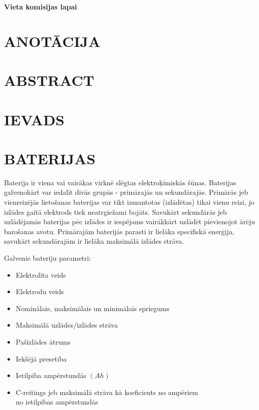\documentclass[12pt,fleqn,titlepage,oneside]{article}
\numberwithin{equation}{section}
\numberwithin{figure}{section}
\numberwithin{table}{section}
\begin{document}
\begin{titlepage}
	\centering
	\vspace*{\fill}
	{\Large\centering\textbf{Vieta komisijas lapai}}
	\vspace*{\fill}
\end{titlepage}

\onehalfspacing
\FloatBarrier
\newpage
\setcounter{page}{4} %
\section*{\MakeUppercase{Anotācija}}

\newpage

\section*{\MakeUppercase{Abstract}}

\newpage
\tableofcontents

\newpage
{}
\section*{\texorpdfstring{\MakeUppercase{Ievads}}{Ievads}}

\FloatBarrier
\newpage
\section{\texorpdfstring{\MakeUppercase{Baterijas}}{Baterijas}}

Baterija ir viena vai vairākas virknē slēgtas elektroķīmiskās šūnas.
Baterijas galvenokārt var iedalīt divās grupās - primārajās un sekundārajās.
Primārās jeb vienreizējās lietošanas baterijas var tikt izmantotas (izlādētas) tikai vienu reizi, jo izlādes gaitā elektrods tiek neatrgiežami bojāts.
Savukārt sekundārās jeb uzlādējamās baterijas pēc izlādes ir iespējams vairākkārt uzlādēt pievienojot ārēju barošanas avotu.
Primārajām baterijās parasti ir lielāka specifiskā enerģija, savukārt sekundārajām ir lielāka maksimālā izlādes strāva.

Galvenie bateriju parametri:
\begin{itemize}
	\item Elektrolīta veids
	\item Elektrodu veids
	\item Nominālais, maksimālais un minimālais spriegums
	\item Maksimālā uzlādes/izlādes strāva
	\item Pašizlādes ātrums
	\item Iekšējā presetība
	\item Ietilpība ampērstundās $(Ah)$
	\item C-reitings jeb maksimālā strāva kā koeficients no ampēriem\\ no ietilpības ampērstundās
\end{itemize}
\end{document}
